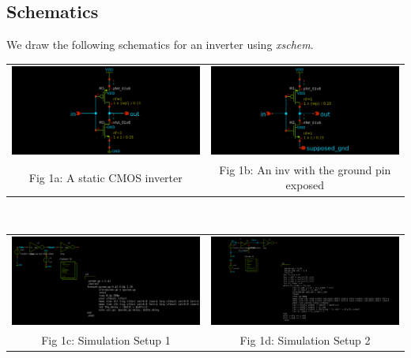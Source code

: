 \documentclass[12pt,a4paper]{article}
\begin{document}
\subsection{Schematics}
\noindent We draw the following schematics for an inverter using \emph{xschem}.
\begin{center}
\begin{tabular}{cc}
     \includegraphics[width=0.40\linewidth]{tut3/reports/media/inv.png} &
     \includegraphics[width=0.40\linewidth]{tut3/reports/media/inv_nognd.png} \\
     Fig 1a: A static CMOS inverter & Fig 1b: An inv with the ground pin exposed
\end{tabular}
\\
\begin{tabular}{cc}
     \includegraphics[width=0.40\linewidth]{tut3/reports/media/expt1_a.sch.png} &
     \includegraphics[width=0.40\linewidth]{tut3/reports/media/expt1_b.sch.png} \\
     Fig 1c: Simulation Setup 1 & Fig 1d: Simulation Setup 2
\end{tabular}
\end{center}
\end{document}
